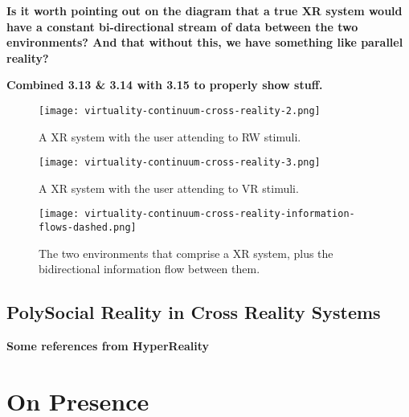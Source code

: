 \textbf{Is it worth pointing out on the diagram that a true XR system would have a constant bi-directional stream of data between the two environments? And that without this, we have something like parallel reality?}

\textbf{Combined 3.13 \& 3.14 with 3.15 to properly show stuff.}

\begin{figure}[h]
	\begin{center}
		\texttt{[image: virtuality-continuum-cross-reality-2.png]}
		\caption{A XR system with the user attending to RW stimuli.}
		\label{virtuality-continuum-cross-reality-2}
	\end{center}
\end{figure}

\begin{figure}[h]
	\begin{center}
		\texttt{[image: virtuality-continuum-cross-reality-3.png]}
		\caption{A XR system with the user attending to VR stimuli.}
		\label{virtuality-continuum-cross-reality-3}
	\end{center}
\end{figure}

\begin{figure}[h]
	\begin{center}
		\texttt{[image: virtuality-continuum-cross-reality-information-flows-dashed.png]}
		\caption{The two environments that comprise a XR system, plus the bidirectional information flow between them.}
	\end{center}
\end{figure}


\subsection{PolySocial Reality in Cross Reality Systems}

\textbf{Some references from HyperReality}


\section{On Presence}

